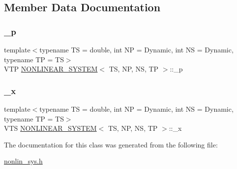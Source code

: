 \subsection{Member Data Documentation}
\mbox{\label{class_n_o_n_l_i_n_e_a_r___s_y_s_t_e_m_aee48110f36d056d217437af5e7cc5447}} 
\subsubsection{\texorpdfstring{\+\_\+p}{\_p}}
{\footnotesize\ttfamily template$<$typename TS = double, int NP = Dynamic, int NS = Dynamic, typename TP = TS$>$ \\
V\+TP \mbox{\hyperlink{class_n_o_n_l_i_n_e_a_r___s_y_s_t_e_m}{N\+O\+N\+L\+I\+N\+E\+A\+R\+\_\+\+S\+Y\+S\+T\+EM}}$<$ TS, NP, NS, TP $>$\+::\+\_\+p\hspace{0.3cm}{\ttfamily [protected]}}

\mbox{\label{class_n_o_n_l_i_n_e_a_r___s_y_s_t_e_m_a06e2289a0e10aa47527d5fd348faf4f9}} 
\subsubsection{\texorpdfstring{\+\_\+x}{\_x}}
{\footnotesize\ttfamily template$<$typename TS = double, int NP = Dynamic, int NS = Dynamic, typename TP = TS$>$ \\
V\+TS \mbox{\hyperlink{class_n_o_n_l_i_n_e_a_r___s_y_s_t_e_m}{N\+O\+N\+L\+I\+N\+E\+A\+R\+\_\+\+S\+Y\+S\+T\+EM}}$<$ TS, NP, NS, TP $>$\+::\+\_\+x\hspace{0.3cm}{\ttfamily [protected]}}



The documentation for this class was generated from the following file\+:\begin{DoxyCompactItemize}
\item 
\mbox{\hyperlink{nonlin__sys_8h}{nonlin\+\_\+sys.\+h}}\end{DoxyCompactItemize}
